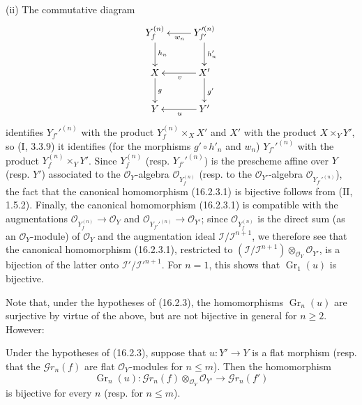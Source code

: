 \noindent(ii) The commutative diagram
\[
  \xymatrix{
    Y_f^{(n)} \ar[d]^{h_n}
      & Y_{f'}'^{(n)} \ar[d]^-{h'_n} \ar[l]^{w_n} \\
    X \ar[d]^g
      & X' \ar[d]^{g'} \ar[l]^v \\
    Y
      & Y' \ar[l]^u
  }
\]
identifies $Y_{f'}'^{(n)}$ with the product $Y_f^{(n)}\times_X X'$ and $X'$ with the product
$X\times_Y Y'$, so (I, 3.3.9) it identifies (for the morphisms
$g'\circ h'_n$ and $w_n$) $Y_{f'}'^{(n)}$ with the product
$Y_f^{(n)}\times_Y Y'$. Since $Y_f^{(n)}$ (resp. $Y_{f'}'^{(n)}$) is the
prescheme affine over $Y$ (resp. $Y'$) associated to the
$\mathcal{O}_Y$-algebra $\mathcal{O}_{Y_f^{(n)}}$ (resp. to the
$\mathcal{O}_{Y'}$-algebra $\mathcal{O}_{Y_{f'}'^{(n)}}$), the fact that
the canonical homomorphism (16.2.3.1) is bijective follows from (II, 1.5.2).
Finally, the canonical homomorphism (16.2.3.1) is compatible with the
augmentations
$\mathcal{O}_{Y_f^{(n)}}\to\mathcal{O}_Y$ and
$\mathcal{O}_{Y_{f'}'^{(n)}}\to\mathcal{O}_{Y'}$; since
$\mathcal{O}_{Y_f^{(n)}}$ is the direct sum (as an
$\mathcal{O}_Y$-module) of $\mathcal{O}_Y$ and the augmentation ideal
$\mathscr{I}/\mathscr{I}^{n+1}$, we therefore see that the canonical homomorphism
(16.2.3.1), restricted to
$(\mathscr{I}/\mathscr{I}^{n+1})\otimes_{\mathcal{O}_Y}\mathcal{O}_{Y'}$,
is a bijection of the latter onto
$\mathscr{I}'/\mathscr{I}'^{n+1}$. For $n=1$, this shows that
$\operatorname{Gr}_1(u)$ is bijective.

Note that, under the hypotheses of (16.2.3), the homomorphisms
$\operatorname{Gr}_n(u)$ are surjective by virtue of the above, but are
not bijective in general for $n\geq 2$. However:

\begin{corollary}[16.2.4]
\label{IV.16.2.4}
Under the hypotheses of (16.2.3), suppose that $u:Y'\to Y$ is a flat
morphism (resp. that the $\mathscr{G}r_n(f)$ are flat $\mathcal{O}_Y$-modules
for $n\leq m$). Then the homomorphism
\[
  \operatorname{Gr}_n(u):
  \mathscr{G}r_n(f)\otimes_{\mathcal{O}_Y}\mathcal{O}_{Y'}
  \longrightarrow\mathscr{G}r_n(f')
\]
is bijective for every $n$ (resp. for $n\leq m$).
\end{corollary}

